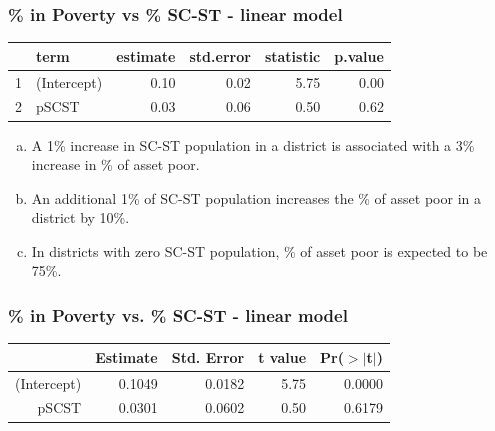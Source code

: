 \documentclass[notes,11pt, aspectratio=169]{beamer}
\begin{document}
\begin{frame}
\frametitle{\% in Poverty vs \% SC-ST - linear model}


{\small
\begin{center}
\begin{tabular}{rlrrrr}
  \hline
 & term & estimate & std.error & statistic & p.value \\ 
  \hline
1 & (Intercept) & 0.10 & 0.02 & 5.75 & 0.00 \\ 
  2 & pSCST & 0.03 & 0.06 & 0.50 & 0.62 \\ 
   \hline
\end{tabular}
\end{center}
}

\begin{enumerate}[(a)]
\item A 1\% increase in SC-ST population in a district is associated with a 3\% increase in \% of asset poor.
\item An additional 1\% of SC-ST population increases the \% of asset poor in a district by 10\%.
\item In districts with zero SC-ST population, \% of asset poor is expected to be 75\%.
\end{enumerate}

\end{frame}


\begin{frame}
\frametitle{\% in Poverty vs. \% SC-ST - linear model}


{\small
\begin{center}
\begin{tabular}{rrrrr}
  \hline
 & Estimate & Std. Error & t value & Pr($>$$|$t$|$) \\ 
  \hline
(Intercept) & 0.1049 & 0.0182 & 5.75 & 0.0000 \\ 
  pSCST & 0.0301 & 0.0602 & 0.50 & 0.6179 \\ 
   \hline
\end{tabular}
\end{center}
}

$\:$ \\


\end{frame}
\end{document}
